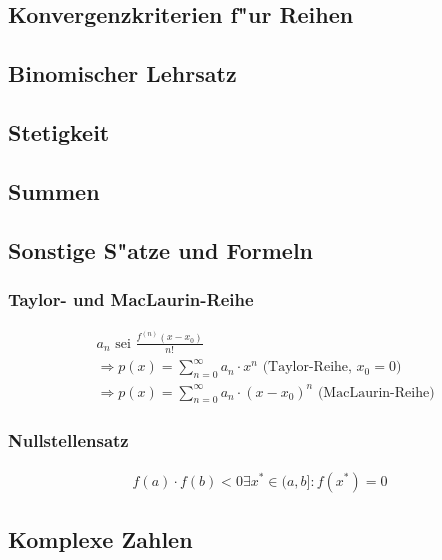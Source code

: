\subsection{Konvergenzkriterien f"ur Reihen}

\subsection{Binomischer Lehrsatz}

\subsection{Stetigkeit}

\subsection{Summen}

\subsection{Sonstige S"atze und Formeln}
	\subsubsection{Taylor- und MacLaurin-Reihe}
		\begin{align}
			&a_n \mbox{ sei } \frac{f^{(n)}(x-x_0)}{n!} \\
			&\Rightarrow p(x) = \sum_{n=0}^{\infty} a_n \cdot x^n \mbox{ (Taylor-Reihe, } x_0=0 \mbox{)} \\
			&\Rightarrow p(x) = \sum_{n=0}^{\infty} a_n \cdot (x-x_0)^n \mbox{ (MacLaurin-Reihe)}
		\end{align}

	\subsubsection{Nullstellensatz}
		\begin{align}
			f(a) \cdot f(b) < 0 \exists x^* \in (a, b]: f(x^*) = 0 
		\end{align}

\subsection{Komplexe Zahlen}
	